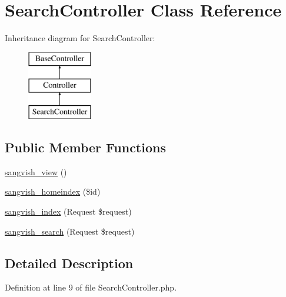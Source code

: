 \hypertarget{class_responsive_1_1_http_1_1_controllers_1_1_search_controller}{}\section{Search\+Controller Class Reference}
\label{class_responsive_1_1_http_1_1_controllers_1_1_search_controller}
Inheritance diagram for Search\+Controller\+:\begin{figure}[H]
\begin{center}
\leavevmode
\includegraphics[height=3.000000cm]{class_responsive_1_1_http_1_1_controllers_1_1_search_controller}
\end{center}
\end{figure}
\subsection*{Public Member Functions}
\begin{DoxyCompactItemize}
\item 
\mbox{\hyperlink{class_responsive_1_1_http_1_1_controllers_1_1_search_controller_a8a8d08fbcb659dd796d5ba74a9faccb9}{sangvish\+\_\+view}} ()
\item 
\mbox{\hyperlink{class_responsive_1_1_http_1_1_controllers_1_1_search_controller_ac12fb87989d2239d92a08822175b0bef}{sangvish\+\_\+homeindex}} (\$id)
\item 
\mbox{\hyperlink{class_responsive_1_1_http_1_1_controllers_1_1_search_controller_ad414371929ed85e1b40a7fda6b3556aa}{sangvish\+\_\+index}} (Request \$request)
\item 
\mbox{\hyperlink{class_responsive_1_1_http_1_1_controllers_1_1_search_controller_aff397d8cc4fb75baf9fc36e28187aefc}{sangvish\+\_\+search}} (Request \$request)
\end{DoxyCompactItemize}


\subsection{Detailed Description}


Definition at line 9 of file Search\+Controller.\+php.



